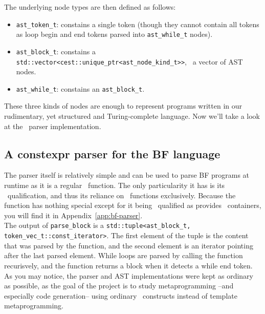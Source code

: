 \documentclass[../../main.tex]{subfiles}
\begin{document}
% 

The underlying node types are then defined as follows:

\begin{itemize}
\item \lstinline|ast_token_t|: constains a single token (though they cannot
      contain all tokens as loop begin and end tokens parsed into
      \lstinline|ast_while_t| nodes).
\item \lstinline|ast_block_t|: constains a
      \lstinline|std::vector<cest::unique_ptr<ast_node_kind_t>>|, \ie~a vector
      of AST nodes.
\item \lstinline|ast_while_t|: constains an \lstinline|ast_block_t|.
\end{itemize}

These three kinds of nodes are enough to represent programs written in our
rudimentary, yet structured and Turing-complete language. Now we'll take a look
at the \constexpr~parser implementation.

\subsection{A constexpr parser for the BF language}

The parser itself is relatively simple and can be used to parse BF programs at
runtime as it is a regular \cpp~function. The only particularity it has is its
\constexpr~qualification, and thus its reliance on \constexpr~functions
exclusively. Because the function has nothing special except for it being
\constexpr~qualified as  provides
\constexpr~containers\cite{more-constexpr-containers}, you will find it in
Appendix~\ref{app:bf-parser}.\\

The output of \lstinline|parse_block| is a
\lstinline|std::tuple<ast_block_t, token_vec_t::const_iterator>|. The first
element of the tuple is the content that was parsed by the function, and the
second element is an iterator pointing after the last parsed element. While
loops are parsed by calling the function recurisvely, and the function returns a
block when it detects a while end token. As you may notice, the parser and AST
implementations were kept as ordinary as possible, as the goal of the
project is to study metaprogramming --and especially code generation-- using
ordinary \cpp~constructs instead of template metaprogramming.\\
\end{document}
